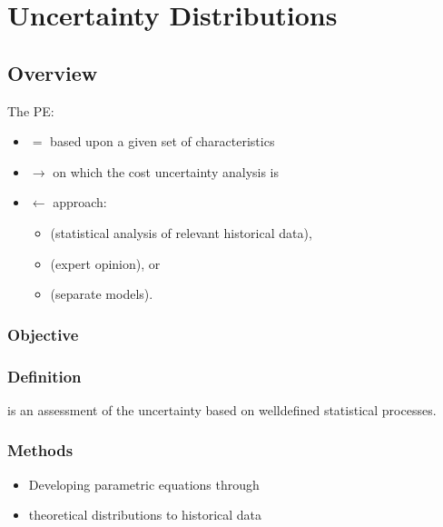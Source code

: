 \documentclass[letterpaper,10pt,english]{jupyterBook}
\begin{document}
\section{Uncertainty Distributions}
\label{\detokenize{PM/jcsrua:uncertainty-distributions}}

\subsection{Overview}
\label{\detokenize{PM/jcsrua:overview}}
\sphinxAtStartPar
The PE:
\begin{itemize}
\item {} 
\sphinxAtStartPar
\(=\)  based upon a given set of characteristics

\item {} 
\sphinxAtStartPar
\(\rightarrow\)  on which the cost uncertainty analysis is 

\item {} 
\sphinxAtStartPar
\(\leftarrow\) approach:
\begin{itemize}
\item {} 
\sphinxAtStartPar
{} (statistical analysis of relevant historical data),

\item {} 
\sphinxAtStartPar
{} (expert opinion), or

\item {} 
\sphinxAtStartPar
{} (separate models).

\end{itemize}

\end{itemize}


\subsubsection{Objective}
\label{\detokenize{PM/jcsrua:id1}}

\subsubsection{Definition}
\label{\detokenize{PM/jcsrua:id2}}
\sphinxAtStartPar
{} is an assessment of the uncertainty based on well\sphinxhyphen{}defined statistical processes.


\subsubsection{Methods}
\label{\detokenize{PM/jcsrua:methods}}\begin{itemize}
\item {} 
\sphinxAtStartPar
Developing parametric equations through 

\item {} 
\sphinxAtStartPar
{} theoretical distributions to historical data

\end{itemize}
\end{document}
